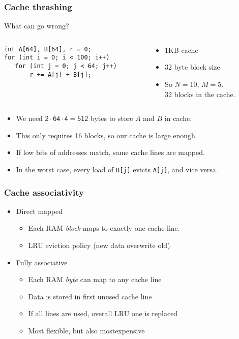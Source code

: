 \documentclass[dvipsnames,presentation,aspectratio=169,14pt]{beamer}
\begin{document}
\begin{frame}[fragile]
  \frametitle{Cache thrashing}
  \begin{block}{What can go wrong?}
    \begin{columns}
      \begin{column}{0.45\textwidth}
\begin{verbatim}
int A[64], B[64], r = 0;
for (int i = 0; i < 100; i++)
   for (int j = 0; j < 64; j++)
       r += A[j] + B[j];
\end{verbatim}
      \end{column}
      \begin{column}{0.45\textwidth}
        \begin{itemize}
        \item 1KB cache
        \item 32 byte block size
        \item So $N=10$, $M=5$. \\32 blocks in the cache.
        \end{itemize}
      \end{column}
    \end{columns}
  \end{block}


  \begin{itemize}[wide=0pt,itemsep=4pt]
  \item We need $\mathsf{2 \cdot 64 \cdot 4 = 512}$ bytes to store $A$ and $B$
    in cache.
  \item This only requires 16 blocks, so our cache is large enough.
  \item If low bits of addresses match, same cache lines are mapped.
  \item In the worst case, every load of \texttt{B[j]} evicts
    \texttt{A[j]}, and vice versa.
  \end{itemize}

\end{frame}

\begin{frame}[t]
  \frametitle{Cache associativity}
  \begin{itemize}[itemsep=8pt]
  \item Direct mapped
    \begin{itemize}[wide=0pt,itemsep=6pt]
    \item Each RAM \emph{block} maps to exactly one cache
      line.
    \item LRU eviction policy (new data overwrite old)
    \end{itemize}
  \item<2> Fully associative
    \begin{itemize}[wide=0pt,itemsep=6pt]
    \item Each RAM \emph{byte} can map to any cache line
    \item Data is stored in first unused cache line
    \item If all lines are used, overall LRU one is replaced
    \item Most flexible, but also mostexpensive
    \end{itemize}
  \end{itemize}
\end{frame}
\end{document}
